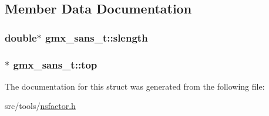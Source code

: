 \subsection{\-Member \-Data \-Documentation}
\hypertarget{structgmx__sans__t_aa90787e8b0a3555ec12bc0a2dddaa0c6}{
\subsubsection[{slength}]{\setlength{\rightskip}{0pt plus 5cm}double$\ast$ {\bf gmx\-\_\-sans\-\_\-t\-::slength}}}\label{structgmx__sans__t_aa90787e8b0a3555ec12bc0a2dddaa0c6}
\hypertarget{structgmx__sans__t_a8aac43957e3e0b2c6000615bc838e77f}{
\subsubsection[{top}]{$\ast$ {\bf gmx\-\_\-sans\-\_\-t\-::top}}}\label{structgmx__sans__t_a8aac43957e3e0b2c6000615bc838e77f}


\-The documentation for this struct was generated from the following file\-:\begin{DoxyCompactItemize}
\item 
src/tools/\hyperlink{nsfactor_8h}{nsfactor.\-h}\end{DoxyCompactItemize}
